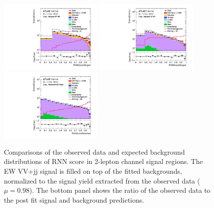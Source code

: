\begin{figure}[]
    \centering
    \includegraphics[width=0.45\textwidth]{figures/PostFit/Region_distRNNScoreMerged_DSRVBSHP_BMin0_J0_incJet1_L2_T0_incFat1_Y6051_incTag1_Fat1_GlobalFit_unconditionnal_mu1log}
    \includegraphics[width=0.45\textwidth]{figures/PostFit/Region_distRNNScoreMerged_DSRVBSLP_BMin0_J0_incJet1_L2_T0_incFat1_Y6051_incTag1_Fat1_GlobalFit_unconditionnal_mu1log}
    \includegraphics[width=0.45\textwidth]{figures/PostFit/Region_distRNNScoreResolved_DSRVBSFid_BMin0_T0_Y6051_incTag1_J2_L2_incJet1_GlobalFit_unconditionnal_mu1log}
    \caption{Comparisons of the observed data and expected background distributions of RNN score in 2-lepton channel signal regions. The EW VV+jj signal is filled on top of the fitted backgrounds, normalized to the signal yield extracted from the observed data ($\mu = 0.98$). The bottom panel shows the ratio of the observed data to the post fit signal and background predictions.}
    \label{fig:postSR2lep}
\end{figure}

